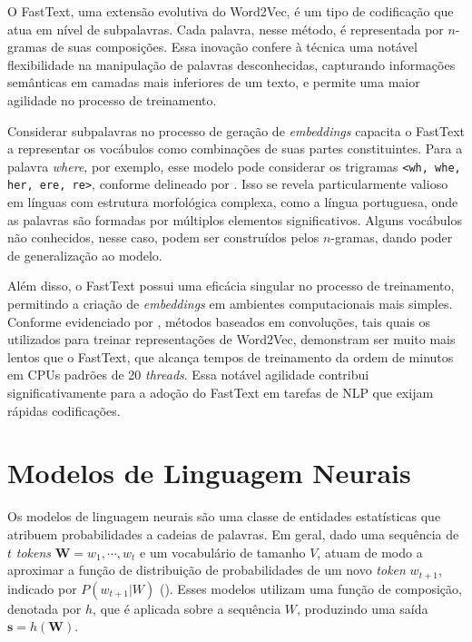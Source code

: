O FastText, uma extensão evolutiva do Word2Vec, é um tipo de codificação que atua em nível de subpalavras. Cada palavra, nesse método, é representada por $n$-gramas de suas composições. Essa inovação confere à técnica uma notável flexibilidade na manipulação de palavras desconhecidas, capturando informações semânticas em camadas mais inferiores de um texto, e permite uma maior agilidade no processo de treinamento.

Considerar subpalavras no processo de geração de \textit{embeddings} capacita o FastText a representar os vocábulos como combinações de suas partes constituintes. Para a palavra \textit{where}, por exemplo, esse modelo pode considerar os trigramas \texttt{<wh, whe, her, ere, re>}, conforme delineado por \citet{bojanowski-etal-2016-enriching}. Isso se revela particularmente valioso em línguas com estrutura morfológica complexa, como a língua portuguesa, onde as palavras são formadas por múltiplos elementos significativos. Alguns vocábulos não conhecidos, nesse caso, podem ser construídos pelos $n$-gramas, dando poder de generalização ao modelo.

Além disso, o FastText possui uma eficácia singular no processo de treinamento, permitindo a criação de \textit{embeddings} em ambientes computacionais mais simples. Conforme evidenciado por \citet{joulin-etal-2016-bag}, métodos baseados em convoluções, tais quais os utilizados para treinar representações de Word2Vec, demonstram ser muito mais lentos que o FastText, que alcança tempos de treinamento da ordem de minutos em CPUs padrões de 20 \textit{threads}. Essa notável agilidade contribui significativamente para a adoção do FastText em tarefas de NLP que exijam rápidas codificações.

\section{Modelos de Linguagem Neurais}

Os modelos de linguagem neurais são uma classe de entidades estatísticas que atribuem probabilidades a cadeias de palavras. Em geral, dado uma sequência de $t$ \textit{tokens} $\boldsymbol{W} = w_{1}, \cdots, w_{t}$ e um vocabulário de tamanho $V$, atuam de modo a aproximar a função de distribuição de probabilidades de um novo \textit{token} $w_{t+1}$, indicado por $P(w_{t+1} | W)$ (\cite{sun-iyyer-2021}). Esses modelos utilizam uma função de composição, denotada por $h$, que é aplicada sobre a sequência $W$, produzindo uma saída $\boldsymbol{s} = h(\boldsymbol{W})$.

